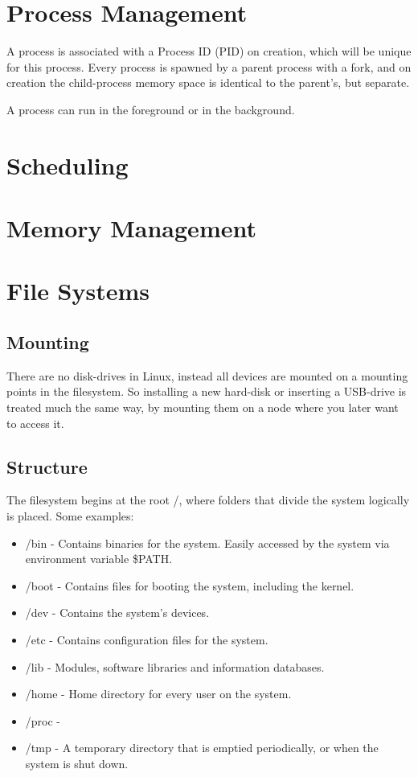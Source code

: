 \documentclass[12pt]{article}
\begin{document}
\section{Process Management} %
A process is associated with a Process ID (PID) on creation, which will be unique for this process. 
Every process is spawned by a parent process with a fork, 
and on creation the child-process memory space is identical to the parent's, but separate.

A process can run in the foreground or in the background.

\section{Scheduling} %

\section{Memory Management} %

\section{File Systems} %

\subsection{Mounting}
There are no disk-drives in Linux, instead all devices are mounted on a mounting points in the filesystem. 
So installing a new hard-disk or inserting a USB-drive is treated much the same way,
 by mounting them on a node where you later want to access it.

\subsection{Structure}
  The filesystem begins at the root /, where folders that divide the system logically is placed. Some examples:
  \begin{itemize}
    \item /bin - Contains binaries for the system. Easily accessed by the system via environment variable \$PATH.
    \item /boot - Contains files for booting the system, including the kernel.
    \item /dev - Contains the system's devices.
    \item /etc - Contains configuration files for the system.
    \item /lib - Modules, software libraries and information databases.
    \item /home - Home directory for every user on the system. 
    \item /proc - 
    \item /tmp - A temporary directory that is emptied periodically, or when the system is shut down.
  \end{itemize}
 
\end{document}
